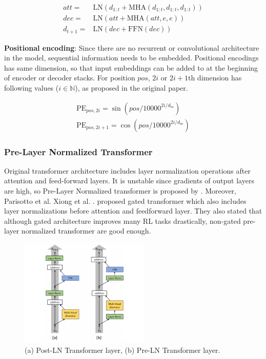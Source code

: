 \begin{equation}
\begin{split}
att = & \mathrm{LN}(d_{1:t}+\mathrm{MHA}(d_{1:t},d_{1:t},d_{1:t})) \\
dec = & \mathrm{LN}(att+ \mathrm{MHA}(att,e,e)) \\
d_{t+1} = & \mathrm{LN}(dec+ \mathrm{FFN}(dec))
\end{split}
\end{equation}

\textbf{Positional encoding}: Since there are no recurrent or convolutional architecture in the model, sequential information needs to be embedded. Positional encodings has same dimension, so that input embeddings can be added to at the beginning of encoder or decoder stacks. For position $pos$, $2i$ or $2i+1$th dimension has following values ($i \in \mathbb{N}$), as proposed in the original paper.

\begin{equation}
\begin{split}
\mathrm{PE}_{pos,2i} = \sin(pos/10000^{2i/d_m}) \\
\mathrm{PE}_{pos,2i+1} = \cos(pos/10000^{2i/d_m})
\end{split}
\end{equation}

\subsubsection{Pre-Layer Normalized Transformer}
Original transformer architecture includes layer normalization operations after attention and feed-forward layers. It is unstable since gradients of output layers are high, so Pre-Layer Normalized transformer is proposed by \cite{xiong_layer_2020}. Moreover,  Parisotto et al. Xiong et al. \cite{parisotto_stabilizing_2019}. proposed gated transformer which also includes layer normalizations before attention and feedforward layer. They also stated that although gated architecture improves many RL tasks drastically, non-gated pre-layer normalized transformer are good enough. 

\begin{figure}
	\centering
	\includegraphics[width=0.55\textwidth]{figures/ml_theory/post_pre_trsf.png}
	\caption{(a) Post-LN Transformer layer, (b) Pre-LN Transformer
		layer.}
	\label{fig:post_pre_trsf}
\end{figure}

